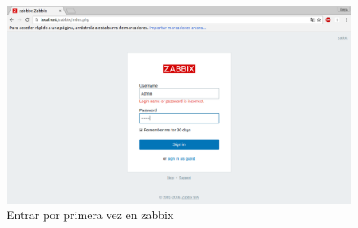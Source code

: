 \begin{itemize}
	\begin{figure}[H]
	\centering
	\includegraphics[width=0.7\linewidth]{zabbix7}
	\caption[zabbix7]{Entrar por primera vez en zabbix}
	\label{fig:zabbix7}
	\end{figure}
	
	
	 
\end{itemize}


